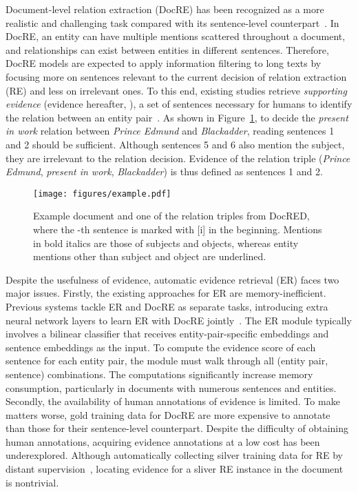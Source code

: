 \documentclass[11pt]{article}
\begin{document}
Document-level relation extraction (DocRE) has been recognized as a more realistic and challenging task compared with its sentence-level counterpart~\cite{peng-etal-2017-cross,verga-etal-2018-simultaneously,yao-etal-2019-docred}.
In DocRE, an entity can have multiple mentions scattered throughout a document, and relationships can exist between entities in different sentences.
Therefore, DocRE models are expected to apply information filtering to long texts by focusing more on sentences relevant to the current decision of relation extraction (RE) and less on irrelevant ones.
To this end, existing studies retrieve \textit{supporting evidence} (evidence hereafter, \citealp{yao-etal-2019-docred}), a set of sentences necessary for humans to identify the relation between an entity pair~\cite{huang-etal-2021-entity,huang-etal-2021-three,xie-etal-2022-eider,xiao-etal-2022-sais,xu-etal-2022-document}.
As shown in Figure~\ref{fig:example}, to decide the \textit{present in work} relation between \textit{Prince Edmund} and \textit{Blackadder}, reading sentences 1 and 2 should be sufficient.
Although sentences 5 and 6 also mention the subject, they are irrelevant to the relation decision.
Evidence of the relation triple (\textit{Prince Edmund}, \textit{present in work}, \textit{Blackadder}) is thus defined as sentences 1 and 2.
\begin{figure}[t]
    \centering
    \texttt{[image: figures/example.pdf]}
    \caption{Example document and one of the relation triples from DocRED, where the -th sentence is marked with [i] in the beginning. Mentions in bold italics are those of subjects and objects, whereas entity mentions other than subject and object are underlined.}
    \label{fig:example}
\end{figure}

Despite the usefulness of evidence, automatic evidence retrieval (ER) faces two major issues.
Firstly, the existing approaches for ER are memory-inefficient.
Previous systems tackle ER and DocRE as separate tasks, introducing extra neural network layers to learn ER with DocRE jointly~\cite{huang-etal-2021-entity,xie-etal-2022-eider,xiao-etal-2022-sais}.
The ER module typically involves a bilinear classifier that receives entity-pair-specific embeddings and sentence embeddings as the input.
To compute the evidence score of each sentence for each entity pair, the module must walk through all (entity pair, sentence) combinations.
The computations significantly increase memory consumption, particularly in documents with numerous sentences and entities.
Secondly, the availability of human annotations of evidence is limited.
To make matters worse, gold training data for DocRE are more expensive to annotate than those for their sentence-level counterpart.
Despite the difficulty of obtaining human annotations, acquiring evidence annotations at a low cost has been underexplored.
Although automatically collecting silver training data for RE by distant supervision~\cite{mintz-etal-2009-distant,yao-etal-2019-docred}, locating evidence for a sliver RE instance in the document is nontrivial.
\end{document}
